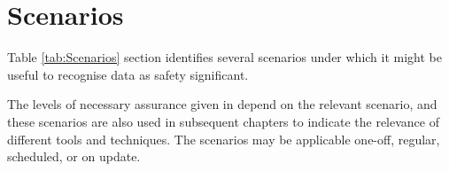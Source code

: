 %
%
\chapter{Scenarios} \label{bkm:scenario}


Table \ref{tab:Scenarios} section identifies several scenarios under which it might be useful to recognise data as safety significant.

The levels of necessary assurance given in 
depend on the relevant scenario, and these scenarios
are also used in subsequent chapters to indicate the relevance of
different tools and techniques. 
The scenarios may be applicable one-off, regular, scheduled, or on update.

